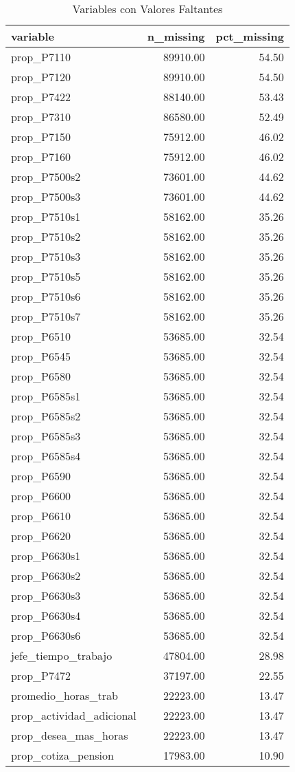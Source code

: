 \begin{table}[ht]
\centering
\begin{tabular}{lrr}
  \toprule
variable & n\_missing & pct\_missing \\ 
  \midrule
prop\_P7110 & 89910.00 & 54.50 \\ 
  prop\_P7120 & 89910.00 & 54.50 \\ 
  prop\_P7422 & 88140.00 & 53.43 \\ 
  prop\_P7310 & 86580.00 & 52.49 \\ 
  prop\_P7150 & 75912.00 & 46.02 \\ 
  prop\_P7160 & 75912.00 & 46.02 \\ 
  prop\_P7500s2 & 73601.00 & 44.62 \\ 
  prop\_P7500s3 & 73601.00 & 44.62 \\ 
  prop\_P7510s1 & 58162.00 & 35.26 \\ 
  prop\_P7510s2 & 58162.00 & 35.26 \\ 
  prop\_P7510s3 & 58162.00 & 35.26 \\ 
  prop\_P7510s5 & 58162.00 & 35.26 \\ 
  prop\_P7510s6 & 58162.00 & 35.26 \\ 
  prop\_P7510s7 & 58162.00 & 35.26 \\ 
  prop\_P6510 & 53685.00 & 32.54 \\ 
  prop\_P6545 & 53685.00 & 32.54 \\ 
  prop\_P6580 & 53685.00 & 32.54 \\ 
  prop\_P6585s1 & 53685.00 & 32.54 \\ 
  prop\_P6585s2 & 53685.00 & 32.54 \\ 
  prop\_P6585s3 & 53685.00 & 32.54 \\ 
  prop\_P6585s4 & 53685.00 & 32.54 \\ 
  prop\_P6590 & 53685.00 & 32.54 \\ 
  prop\_P6600 & 53685.00 & 32.54 \\ 
  prop\_P6610 & 53685.00 & 32.54 \\ 
  prop\_P6620 & 53685.00 & 32.54 \\ 
  prop\_P6630s1 & 53685.00 & 32.54 \\ 
  prop\_P6630s2 & 53685.00 & 32.54 \\ 
  prop\_P6630s3 & 53685.00 & 32.54 \\ 
  prop\_P6630s4 & 53685.00 & 32.54 \\ 
  prop\_P6630s6 & 53685.00 & 32.54 \\ 
  jefe\_tiempo\_trabajo & 47804.00 & 28.98 \\ 
  prop\_P7472 & 37197.00 & 22.55 \\ 
  promedio\_horas\_trab & 22223.00 & 13.47 \\ 
  prop\_actividad\_adicional & 22223.00 & 13.47 \\ 
  prop\_desea\_mas\_horas & 22223.00 & 13.47 \\ 
  prop\_cotiza\_pension & 17983.00 & 10.90 \\ 
   \bottomrule
\end{tabular}
\caption{Variables con Valores Faltantes} 
\label{tab:missing_values}
\end{table}
